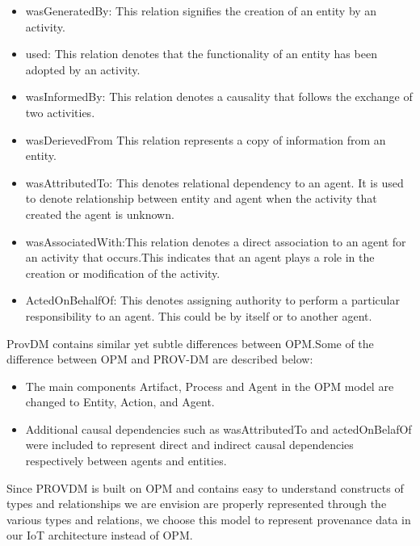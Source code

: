 \begin{itemize}
\item wasGeneratedBy: This relation signifies the creation of an entity by an activity. 

\item used: This relation denotes that the functionality of an entity has been adopted by an activity.

\item wasInformedBy: This relation denotes a causality that follows the exchange of two activities.

\item wasDerievedFrom This relation represents a copy of information from an entity. 

\item wasAttributedTo: This denotes relational dependency to an agent. It is used to denote relationship between entity and agent when the activity that created the agent is unknown.

\item wasAssociatedWith:This relation denotes a direct association to an agent for an activity that occurs.This indicates that an agent plays a role in the creation or modification of the activity.

\item ActedOnBehalfOf: This denotes assigning authority to perform a particular responsibility to an agent. This could be by itself or to another agent.



\end{itemize}

Prov\-DM contains similar yet subtle differences between OPM.Some of the difference between OPM and PROV-DM are described below:

\begin{itemize}

\item The main components Artifact, Process and Agent in the OPM model are changed to Entity, Action, and Agent. 

\item Additional causal dependencies such as wasAttributedTo and actedOnBelafOf were included to represent direct and indirect causal dependencies respectively between agents and entities.

\end{itemize}

Since PROV\-DM is built on OPM and contains easy to understand constructs of types and relationships we are envision are properly represented through the various types and relations, we choose this model to represent provenance data in our IoT architecture instead of OPM. 

